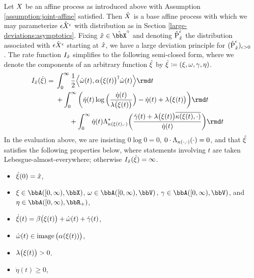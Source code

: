 \begin{theorem}
  \label{eq:ldp-closed-form}
  Let $X$ be an affine process as introduced above with Assumption \ref{assumption:joint-affine} satisfied.
  Then $\hat{X}$ is a base affine process with which we may parameterize $\hat{\epsilon X^\epsilon}$ with distribution as in Section \ref{large-deviations:asymptotics}.
  Fixing $\hat\stateVar \in \hat\stateSpace^\circ$ and denoting $\hat{{\operatorname{P}}}^\epsilon_{\hat{x}}$ the distribution associated with $\hat{\epsilon X^\epsilon}$ starting at $\hat{x}$, we have a large deviation principle for $(\hat{{\operatorname{P}}}^\epsilon_{\hat{x}})_{\epsilon>0}$.
  The rate function $I_{\hat{x}}$ simplifies to the following semi-closed form, where we denote the components of an arbitrary function $\hat{\xi}$ by $\hat{\xi} \coloneqq (\xi, \omega, \gamma, \eta)$.
  \begin{equation*}
    \rf_{\hat\stateVar}(\hat\pathVar) = 
    \begin{aligned}[t]
      &\int_0^\infty \frac12 \Bprj{\dot\omega(t)}{\affDiff\big(\pathVar(t)\big)^\dagger \dot\omega(t)} \rmd t \\
      &+ \int_0^\infty \bigg( \dot\eta(t)\log\Big(\frac{\dot\eta(t)}{\affInt\big(\pathVar(t)\big)} \Big) - \dot\eta(t) + \affInt\big(\pathVar(t)\big) \bigg) \rmd t  \\
      &\qquad+ \int_0^\infty \dot\eta(t) \ode_{\affDist(\pathVar(t),\cdot)}^*\bigg( \frac{\dot\gamma(t) + \affInt\big(\pathVar(t)\big)\overline{\affDist(\pathVar(t), \cdot)}}{\dot\eta(t)} \bigg) \rmd t
    \end{aligned}
  \end{equation*}
  In the evaluation above, we are insisting $0\log 0 = 0$, $0 \cdot \Lambda_{\kappa(\cdot,\cdot)}(\cdot) = 0$, and that $\hat{\xi}$ satisfies the following properties below, where statements involving $t$ are taken Lebesgue-almost-everywhere; otherwise $I_{\hat{x}}(\hat{\xi}) = \infty$.
  \begin{itemize}
    \item
      $\hat{\xi}(0) = \hat{x}$,
    \item
      $\pathVar \in \acpathSpace{[0,\infty)}{\stateSpace}$, $\omega \in \acpathSpace{[0,\infty)}{\vecSpace}$, $\gamma \in \acpathSpace{[0,\infty)}{\vecSpace}$, and $\eta \in \acpathSpace{[0,\infty)}{\bbR_+}$,
    \item
      $\dot{\xi}(t) = \beta\big(\xi(t)\big) + \dot\omega(t) + \dot\gamma(t)$,
    \item
      $\dot\omega(t) \in \operatorname{image}\big(\alpha(\xi(t))\big)$,
    \item
      $\lambda\big(\xi(t)\big) > 0$.
    \item
      $\dot\eta(t) \geq 0$,
  \end{itemize}
\end{theorem}
